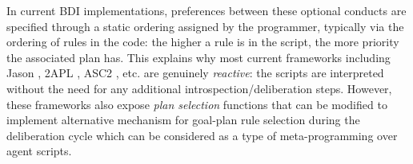 \documentclass[sigconf,anonymous]{aamas}
\begin{document}
In current BDI implementations, preferences between these optional conducts are specified through a static ordering assigned by the programmer, typically via the ordering of rules in the code: the higher a rule is in the script, the more priority the associated plan has. This explains why most current frameworks including Jason \cite{Bordini2005}, 2APL \cite{Dastani2007}, ASC2 \cite{mohajeriparizi_2020_run}, etc. are genuinely \textit{reactive}: the scripts are interpreted without the need for any additional introspection/deliberation steps. However, these frameworks also expose \textit{plan selection} functions that can be modified to implement alternative mechanism for goal-plan rule selection during the deliberation cycle which can be considered as a type of meta-programming over agent scripts. %
\end{document}
